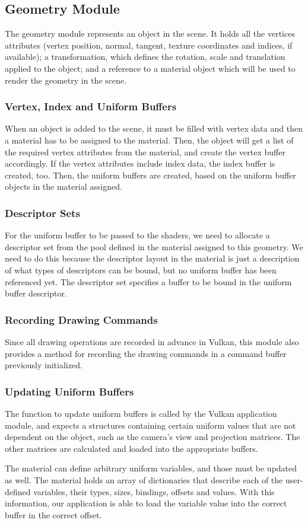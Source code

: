 \subsection{Geometry Module}
The geometry module represents an object in the scene. It holds all the vertices attributes (vertex position, normal, tangent, texture coordinates and indices, if available); a transformation, which defines the rotation, scale and translation applied to the object; and a reference to a material object which will be used to render the geometry in the scene.

\subsubsection{Vertex, Index and Uniform Buffers}
When an object is added to the scene, it must be filled with vertex data and then a material has to be assigned to the material. Then, the object will get a list of the required vertex attributes from the material, and create the vertex buffer accordingly. If the vertex attributes include index data, the index buffer is created, too. Then, the uniform buffers are created, based on the uniform buffer objects in the material assigned.

\subsubsection{Descriptor Sets}
For the uniform buffer to be passed to the shaders, we need to allocate a descriptor set from the pool defined in the material assigned to this geometry. We need to do this because the descriptor layout in the material is just a description of what types of descriptors can be bound, but no uniform buffer has been referenced yet. The descriptor set specifies a buffer to be bound in the uniform buffer descriptor.

\subsubsection{Recording Drawing Commands}
Since all drawing operations are recorded in advance in Vulkan, this module also provides a method for recording the drawing commands in a command buffer previously initialized.

\subsubsection{Updating Uniform Buffers}
The function to update uniform buffers is called by the Vulkan application module, and expects a structures containing certain uniform values that are not dependent on the object, such as the camera's view and projection matrices. The other matrices are calculated and loaded into the appropriate buffers.

The material can define arbitrary uniform variables, and those must be updated as well. The material holds an array of dictionaries that describe each of the user-defined variables, their types, sizes, bindings, offsets and values. With this information, our application is able to load the variable value into the correct buffer in the correct offset.
